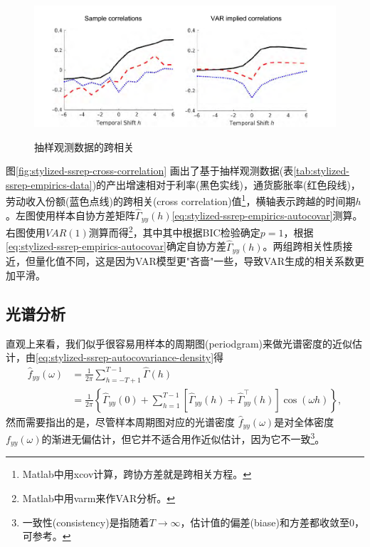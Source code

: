 \begin{figure}[htbp]
  \caption{抽样观测数据的跨相关}
  \centering
  \includegraphics[width=12cm]{./Figures/20180404-corss-correlations}
  \label{fig:stylized-ssrep-cross-correlation}
%
\end{figure}

图\eqref{fig:stylized-ssrep-cross-correlation}
画出了基于抽样观测数据(表\ref{tab:stylized-ssrep-empirics-data})的产出增速相对于利率(黑色实线)，通货膨胀率(红色段线)，劳动收入份额(蓝色点线)的跨相关(cross correlation)值\footnote{Matlab中用xcov计算，跨协方差就是跨相关方程。}，横轴表示跨越的时间期$h$。左图使用样本自协方差矩阵$\widehat{\Gamma}_{yy} \left( h \right)$\eqref{eq:stylized-ssrep-empirics-autocovar}测算。右图使用$VAR(1)$测算而得\footnote{Matlab中用varm来作VAR分析。}，其中其中根据BIC检验确定$p=1$，根据\eqref{eq:stylized-ssrep-empirics-autocovar}确定自协方差$\widehat{\Gamma}_{yy} \left( h \right)$。两组跨相关性质接近，但量化值不同，这是因为VAR模型更"吝啬"一些，导致VAR生成的相关系数更加平滑。

\subsection{光谱分析}
\label{sec:stylized-ssrep-empirics-spectral}

直观上来看，我们似乎很容易用样本的周期图(periodgram)来做光谱密度的近似估计，由\eqref{eq:stylized-ssrep-autocovariance-density}得
\begin{equation}
  \label{eq:spectral-periodgram-def}
\begin{split}
  \hat{f}_{yy} \left( \omega \right)
  & = \frac{1}{2 \pi} \sum_{h=-T+1}^{T-1} \widehat{\Gamma} \left( h \right)  \\
  & = \frac{1}{ 2 \pi}
  \left\{
  \widehat{\Gamma}_{yy} \left( 0 \right)
  + \sum_{h=1}^{T-1}
  \left[
  \widehat{\Gamma}_{yy} \left( h \right)
  + \widehat{\Gamma}_{yy}^{\top} \left( h \right)
  \right]
  \cos \left( \omega h \right)
  \right\},
\end{split}
\end{equation}
然而需要指出的是，尽管样本周期图对应的光谱密度 $\hat{f}_{yy} \left( \omega \right)$是对全体密度$f_{yy} \left( \omega \right)$的渐进无偏估计，但它并不适合用作近似估计，因为它不一致\footnote{
一致性(consistency)是指随着$T \rightarrow \infty$，估计值的偏差(biase)和方差都收敛至$0$，可参考\cite[Sec. 8.2]{Koopmans:1995vn}。}。

